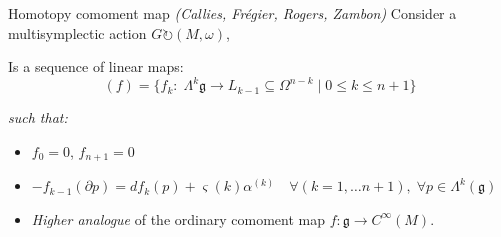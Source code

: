 \documentclass[handout,10pt]{beamer}
\begin{document}
\begin{frame}[fragile,t]{Homotopy comoment map \emph{(Callies, Frégier, Rogers, Zambon)}}
		Consider a multisymplectic action $G \circlearrowright (M, \omega)$,
		\begin{defblock}				
			Is a sequence of linear maps:
			\begin{displaymath}
				(f)  = \big\lbrace f_k: \; \Lambda^k{\mathfrak g} \to L_{k-1} \subseteq \Omega^{n-k} 
				\;\big\vert\; 0\leq k \leq n+1  \big\rbrace
			\end{displaymath}
						
			\emph{such that:}
			\begin{itemize}
				\item $f_0 = 0 $, $f_{n+1} = 0$ %
				\item<2-> $-f_{k-1} (\partial p) = d f_k (p) + \varsigma(k) \alpha^{(k)} \quad \forall (k=1,\dots n+1), \; \forall p \in \Lambda^k(\mathfrak{g})$
			\end{itemize}
		\end{defblock}
		\begin{itemize}
			\item \emph{Higher analogue} of the ordinary comoment map $f\colon \mathfrak{g}\rightarrow C^\infty(M)$.
		\end{itemize}
  \end{frame}
\end{document}
